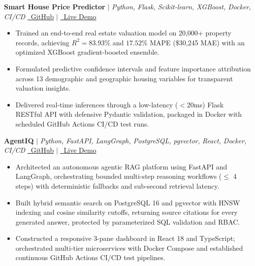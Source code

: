 \documentclass[letterpaper,10pt]{article}
\begin{document}
\noindent
\textbf{Smart House Price Predictor} \hspace{0.2em}$|$\hspace{0.2em} \textit{\small Python, Flask, Scikit-learn, XGBoost, Docker, CI/CD} \hfill \href{https://github.com/AyushKumar-12345/SmartHousePricePredictor}{\faGithub\ GitHub} \hspace{0.35em}$|$\hspace{0.35em} \href{https://smarthousepricepredictor.onrender.com}{\faExternalLink*\ Live Demo}
\begin{itemize}
    \item \small Trained an end-to-end real estate valuation model on 20,000+ property records, achieving $R^2 = 83.93\%$ and $17.52\%$ MAPE (\$30,245 MAE) with an optimized XGBoost gradient-boosted ensemble.
    \item \small Formulated predictive confidence intervals and feature importance attribution across 13 demographic and geographic housing variables for transparent valuation insights.
    \item \small Delivered real-time inferences through a low-latency ($<$20ms) Flask RESTful API with defensive Pydantic validation, packaged in Docker with scheduled GitHub Actions CI/CD test runs.
\end{itemize}
\vspace{1.5pt}

\noindent
\textbf{AgentIQ} \hspace{0.2em}$|$\hspace{0.2em} \textit{\small Python, FastAPI, LangGraph, PostgreSQL, pgvector, React, Docker, CI/CD} \hfill \href{https://github.com/AyushKumar-12345/AgentIQ}{\faGithub\ GitHub} \hspace{0.35em}$|$\hspace{0.35em} \href{https://agentiq-frontend.onrender.com}{\faExternalLink*\ Live Demo}
\begin{itemize}
    \item \small Architected an autonomous agentic RAG platform using FastAPI and LangGraph, orchestrating bounded multi-step reasoning workflows ($\le$ 4 steps) with deterministic fallbacks and sub-second retrieval latency.
    \item \small Built hybrid semantic search on PostgreSQL 16 and pgvector with HNSW indexing and cosine similarity cutoffs, returning source citations for every generated answer, protected by parameterized SQL validation and RBAC.
    \item \small Constructed a responsive 3-pane dashboard in React 18 and TypeScript; orchestrated multi-tier microservices with Docker Compose and established continuous GitHub Actions CI/CD test pipelines.
\end{itemize}
\end{document}
